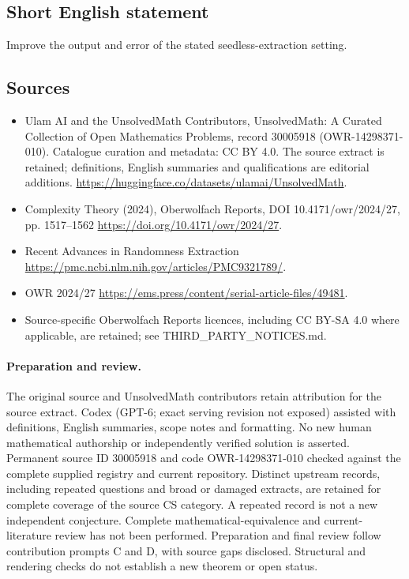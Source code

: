 \documentclass[11pt]{article}
\begin{document}
\subsection{Short English statement}
Improve the output and error of the stated seedless-extraction setting.
\subsection{Sources}
\begin{itemize}
\item[\hypertarget{source:30005918:1}{S1}] Ulam AI and the UnsolvedMath Contributors, UnsolvedMath: A Curated Collection of Open Mathematics Problems, record 30005918 (OWR-14298371-010). Catalogue curation and metadata: CC BY 4.0. The source extract is retained; definitions, English summaries and qualifications are editorial additions.
\url{https://huggingface.co/datasets/ulamai/UnsolvedMath}.
\item[\hypertarget{source:30005918:2}{S2}] Complexity Theory (2024), Oberwolfach Reports, DOI 10.4171/owr/2024/27, pp. 1517--1562
\url{https://doi.org/10.4171/owr/2024/27}.
\item[\hypertarget{source:30005918:3}{S3}] Recent Advances in Randomness Extraction
\url{https://pmc.ncbi.nlm.nih.gov/articles/PMC9321789/}.
\item[\hypertarget{source:30005918:4}{S4}] OWR 2024/27
\url{https://ems.press/content/serial-article-files/49481}.
\item Source-specific Oberwolfach Reports licences, including CC BY-SA 4.0 where applicable, are retained; see THIRD\_PARTY\_NOTICES.md.
\end{itemize}
\paragraph{Preparation and review.}
The original source and UnsolvedMath contributors retain attribution for the source extract. Codex (GPT-6; exact serving revision not exposed) assisted with definitions, English summaries, scope notes and formatting. No new human mathematical authorship or independently verified solution is asserted. Permanent source ID 30005918 and code OWR-14298371-010 checked against the complete supplied registry and current repository. Distinct upstream records, including repeated questions and broad or damaged extracts, are retained for complete coverage of the source CS category. A repeated record is not a new independent conjecture. Complete mathematical-equivalence and current-literature review has not been performed. Preparation and final review follow contribution prompts C and D, with source gaps disclosed. Structural and rendering checks do not establish a new theorem or open status.
\label{end:30005918}
\end{document}
